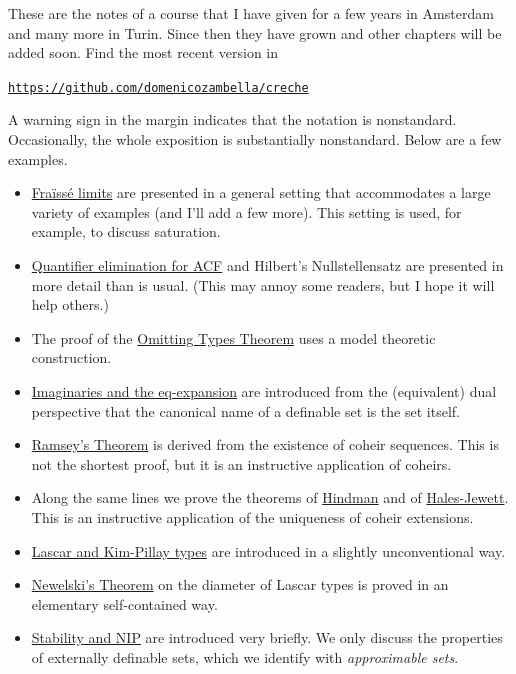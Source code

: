 \documentclass[creche.tex]{subfiles}
\begin{document}
These are the notes of a course that I have given for a few years in Amsterdam and many more in Turin.
Since then they have grown and other chapters will be added soon.
Find the most recent version in 

\hfil\href{https://github.com/domenicozambella/creche}{\tt https://github.com/domenicozambella/creche}


\noindent\llap{\textcolor{red}{\Large\danger}\kern1.5ex}A warning sign in the margin indicates that the notation is nonstandard.
Occasionally, the whole exposition is substantially nonstandard.
Below are a few examples.



\begin{itemize}
\item \hyperref[rich]{Fraïssé limits} are presented in a general setting that accommodates a large variety of examples (and I'll add a few more).
This setting is used, for example, to discuss saturation.
\item \hyperref[algebraic]{Quantifier elimination for ACF} and Hilbert's Nullstellensatz are presented in more detail than is usual.
(This may annoy some readers, but I hope it will help others.)
\item The proof of the \hyperref[countable]{Omitting Types Theorem} uses a model theoretic construction.
\item \hyperref[imaginary]{Imaginaries and the eq-expansion} are introduced from the (equivalent) dual perspective that the canonical name of a definable set is the set itself.
\item \hyperref[Ramsey]{Ramsey's Theorem} is derived from the existence of coheir sequences.
This is not the shortest proof, but it is an instructive application of coheirs.
\item Along the same lines we prove the theorems of \hyperref[Hindman]{Hindman} and of \hyperref[HJ]{Hales-Jewett}. This is an instructive application of the uniqueness of coheir extensions.
\item \hyperref[invariantL]{Lascar and Kim-Pillay types} are introduced in a slightly unconventional way.
\item \hyperref[newelski]{Newelski's Theorem\/} on the diameter of Lascar types is proved in an elementary self-contained way.
\item  \hyperref[external]{Stability and NIP\/} are introduced very briefly.
We only discuss the properties of externally definable sets, which we identify with \textit{approximable sets}.
\end{itemize}
\end{document}

